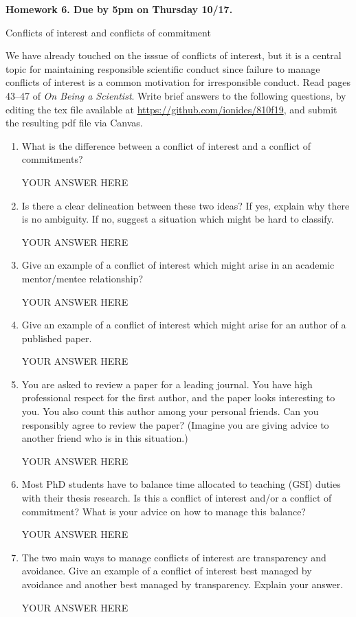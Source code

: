 \documentclass[12pt]{article}
\begin{document}
\begin{center}\bf
Homework 6. Due by 5pm on Thursday 10/17.

Conflicts of interest and conflicts of commitment

\end{center}
We have already touched on the isssue of conflicts of interest, but it is a central topic for maintaining responsible scientific conduct since failure to manage conflicts of interest is a common motivation for irresponsible conduct. Read pages 43--47 of {\em On Being a Scientist}. Write brief answers to the following questions, by editing the tex file available at \url{https://github.com/ionides/810f19}, and submit the resulting pdf file via Canvas.

\begin{enumerate}

\item What is the difference between a conflict of interest and a conflict of commitments? 

YOUR ANSWER HERE

\item Is there a clear delineation between these two ideas? If yes, explain why there is no ambiguity. If no, suggest a situation which might be hard to classify.

YOUR ANSWER HERE

\item Give an example of a conflict of interest which might arise in an academic mentor/mentee relationship?

YOUR ANSWER HERE

\item Give an example of a conflict of interest which might arise for an author of a published paper.

YOUR ANSWER HERE

\item You are asked to review a paper for a leading journal. You have high professional respect for the first author, and the paper looks interesting to you. You also count this author among your personal friends. Can you responsibly agree to review the paper? (Imagine you are giving advice to another friend who is in this situation.)

YOUR ANSWER HERE

\item Most PhD students have to balance time allocated to teaching (GSI) duties with their thesis research. Is this a conflict of interest and/or a conflict of commitment? What is your advice on how to manage this balance?

YOUR ANSWER HERE

\item The two main ways to manage conflicts of interest are transparency and avoidance. Give an example of a conflict of interest best managed by avoidance and another best managed by transparency. Explain your answer.

YOUR ANSWER HERE

\end{enumerate}
\end{document}
